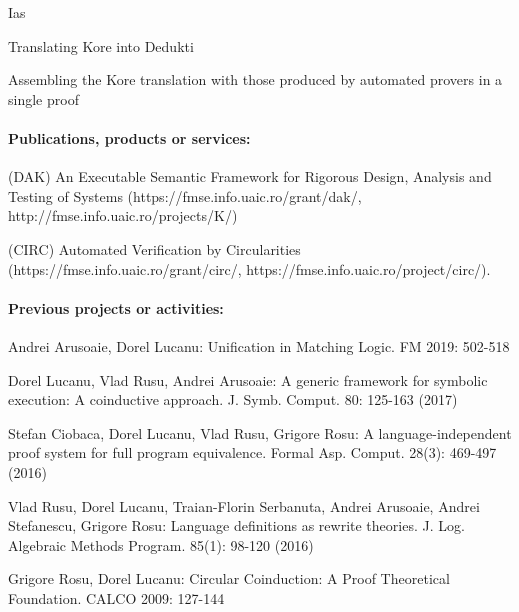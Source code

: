\begin{sitedescription}{Ias}


\begin{compactitem}
\item Translating Kore into Dedukti
\item Assembling the Kore translation with those produced by automated provers in a single proof
\end{compactitem}

\paragraph{Publications, products or services:}


\begin{compactitem}
\item  (DAK) An Executable Semantic Framework for Rigorous Design, Analysis and Testing of Systems
 (https://fmse.info.uaic.ro/grant/dak/, http://fmse.info.uaic.ro/projects/K/) 
\item (CIRC) Automated Verification by Circularities  (https://fmse.info.uaic.ro/grant/circ/, https://fmse.info.uaic.ro/project/circ/).
\end{compactitem}

\paragraph{Previous projects or activities:}


\begin{compactitem}
\item Andrei Arusoaie, Dorel Lucanu:
Unification in Matching Logic. FM 2019: 502-518
\item Dorel Lucanu, Vlad Rusu, Andrei Arusoaie:
A generic framework for symbolic execution: A coinductive approach. J. Symb. Comput. 80: 125-163 (2017)
\item Stefan Ciobaca, Dorel Lucanu, Vlad Rusu, Grigore Rosu:
A language-independent proof system for full program equivalence. Formal Asp. Comput. 28(3): 469-497 (2016)
\item Vlad Rusu, Dorel Lucanu, Traian-Florin Serbanuta, Andrei Arusoaie, Andrei Stefanescu, Grigore Rosu:
Language definitions as rewrite theories. J. Log. Algebraic Methods Program. 85(1): 98-120 (2016)
\item Grigore Rosu, Dorel Lucanu: Circular Coinduction: A Proof Theoretical Foundation. CALCO 2009: 127-144
\end{compactitem}


\end{sitedescription}
